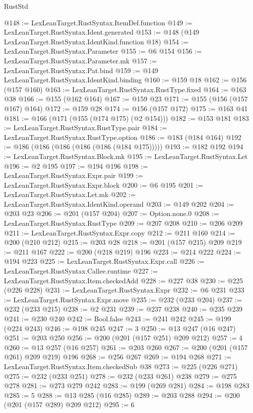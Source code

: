 \begin{lexlean}{RustStd}
\begin{coremodule}
@148 := LexLeanTarget.RustSyntax.ItemDef.function
@149 := LexLeanTarget.RustSyntax.Ident.generated
@153 := @148 (@149 LexLeanTarget.RustSyntax.IdentKind.function @18)
@154 := LexLeanTarget.RustSyntax.Parameter
@155 := @6 @154
@156 := LexLeanTarget.RustSyntax.Parameter.mk
@157 := LexLeanTarget.RustSyntax.Pat.bind
@159 := @149 LexLeanTarget.RustSyntax.IdentKind.binding
@160 := @159 @18
@162 := @156 (@157 @160)
@163 := LexLeanTarget.RustSyntax.RustType.fixed
@164 := @163 @38
@166 := @155 (@162 @164)
@167 := @159 @23
@171 := @155 (@156 (@157 @167) @164)
@172 := @159 @28
@174 := @156 (@157 @172)
@175 := @163 @41
@181 := @166 (@171 (@155 (@174 @175) (@2 @154)))
@182 := @153 @181
@183 := LexLeanTarget.RustSyntax.RustType.pair
@184 := LexLeanTarget.RustSyntax.RustType.option
@186 := @183 (@184 @164)
@192 := @186 (@186 (@186 (@186 (@186 (@184 @175)))))
@193 := @182 @192
@194 := LexLeanTarget.RustSyntax.Block.mk
@195 := LexLeanTarget.RustSyntax.Let
@196 := @2 @195
@197 := @194 @196
@198 := LexLeanTarget.RustSyntax.Expr.pair
@199 := LexLeanTarget.RustSyntax.Expr.block
@200 := @6 @195
@201 := LexLeanTarget.RustSyntax.Let.mk
@202 := LexLeanTarget.RustSyntax.IdentKind.operand
@203 := @149 @202
@204 := @203 @23
@206 := @201 (@157 @204)
@207 := Option.none.{0}
@208 := LexLeanTarget.RustSyntax.RustType
@209 := @207 @208
@210 := @206 @209
@211 := LexLeanTarget.RustSyntax.Expr.copy
@212 := @211 @160
@214 := @200 (@210 @212)
@215 := @203 @28
@218 := @201 (@157 @215) @209
@219 := @211 @167
@222 := @200 (@218 @219) @196
@223 := @214 @222
@224 := @194 @223
@225 := LexLeanTarget.RustSyntax.Expr.call
@226 := LexLeanTarget.RustSyntax.Callee.runtime
@227 := LexLeanTarget.RustSyntax.Item.checkedAdd
@228 := @227 @38
@230 := @225 (@226 @228)
@231 := LexLeanTarget.RustSyntax.Expr
@232 := @6 @231
@233 := LexLeanTarget.RustSyntax.Expr.move
@235 := @232 (@233 @204)
@237 := @232 (@233 @215)
@238 := @2 @231
@239 := @237 @238
@240 := @235 @239
@241 := @230 @240
@242 := Bool.false
@243 := @241 @242
@245 := @199 (@224 @243)
@246 := @198 @245
@247 := 3
@250 := @13 @247 (@16 @247)
@251 := @203 @250
@256 := @200 (@201 (@157 @251) @209 @212)
@257 := 4
@260 := @13 @257 (@16 @257)
@261 := @203 @260
@267 := @200 (@201 (@157 @261) @209 @219) @196
@268 := @256 @267
@269 := @194 @268
@271 := LexLeanTarget.RustSyntax.Item.checkedSub @38
@273 := @225 (@226 @271)
@275 := @232 (@233 @251)
@278 := @232 (@233 @261) @238
@279 := @275 @278
@281 := @273 @279 @242
@283 := @199 (@269 @281)
@284 := @198 @283
@285 := 5
@288 := @13 @285 (@16 @285)
@289 := @203 @288
@294 := @200 (@201 (@157 @289) @209 @212)
@295 := 6

\end{coremodule}
\end{lexlean}
